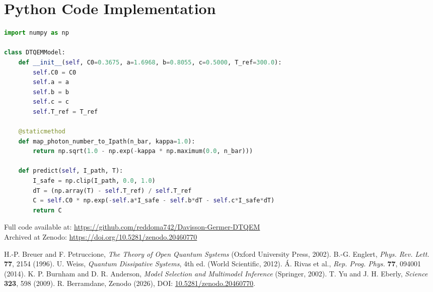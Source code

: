 \documentclass[reprint,amsmath,amssymb,aps,pra,superscriptaddress]{revtex4-2}
\begin{document}
\appendix

\section{Python Code Implementation}

\begin{lstlisting}[language=Python, basicstyle=\ttfamily\small, breaklines=true]
import numpy as np

class DTQEMModel:
    def __init__(self, C0=0.3675, a=1.6968, b=0.8055, c=0.5000, T_ref=300.0):
        self.C0 = C0
        self.a = a
        self.b = b
        self.c = c
        self.T_ref = T_ref

    @staticmethod
    def map_photon_number_to_Ipath(n_bar, kappa=1.0):
        return np.sqrt(1.0 - np.exp(-kappa * np.maximum(0.0, n_bar)))

    def predict(self, I_path, T):
        I_safe = np.clip(I_path, 0.0, 1.0)
        dT = (np.array(T) - self.T_ref) / self.T_ref
        C = self.C0 * np.exp(-self.a*I_safe - self.b*dT - self.c*I_safe*dT)
        return C
\end{lstlisting}

Full code available at: \url{https://github.com/reddoma742/Davisson-Germer-DTQEM} \\
Archived at Zenodo: \url{https://doi.org/10.5281/zenodo.20460770}

\begin{thebibliography}{99}

 H.-P. Breuer and F. Petruccione, \emph{The Theory of Open Quantum Systems} (Oxford University Press, 2002).
 B.-G. Englert, \emph{Phys. Rev. Lett.} \textbf{77}, 2154 (1996).
 U. Weiss, \emph{Quantum Dissipative Systems}, 4th ed. (World Scientific, 2012).
 \'{A}. Rivas et al., \emph{Rep. Prog. Phys.} \textbf{77}, 094001 (2014).
 K. P. Burnham and D. R. Anderson, \emph{Model Selection and Multimodel Inference} (Springer, 2002).
 T. Yu and J. H. Eberly, \emph{Science} \textbf{323}, 598 (2009).
 R. Berramdane, Zenodo (2026), DOI: \url{10.5281/zenodo.20460770}.

\end{thebibliography}
\end{document}
